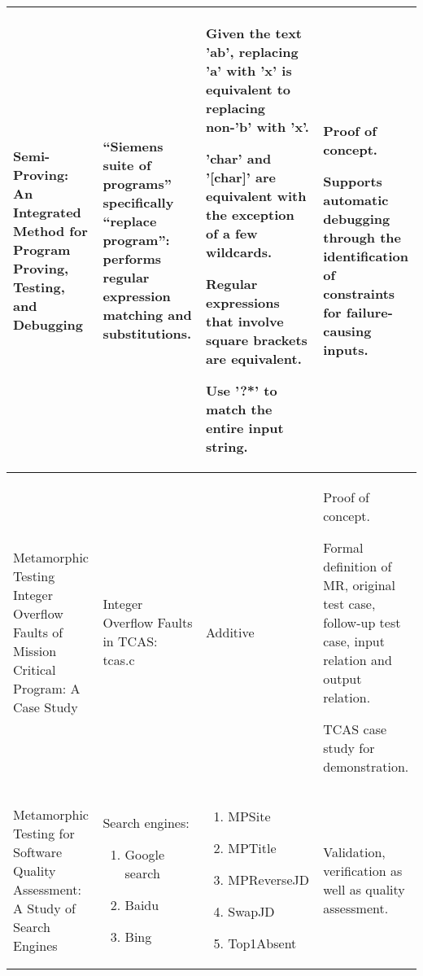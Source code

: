 \begin{singlespace}
\begin{longtable}[c]{| p{3cm} | p{4cm} | p{3.5cm} | p{4cm} |}
  Semi-Proving: An Integrated Method for Program Proving, Testing, and Debugging             &
  “Siemens suite of programs” specifically “replace program”: performs regular expression matching and substitutions.                                                                           &
  Given the text 'ab', replacing 'a' with 'x' is equivalent to replacing non-'b' with 'x'. \par\medskip
  'char' and '[char]' are equivalent with the exception of a few wildcards. \par\medskip
  Regular expressions that involve square brackets are equivalent. \par\medskip
  Use '?*' to match the entire input string.                                                             &
  Proof of concept. \par\medskip
  Supports automatic debugging through the identification of constraints for failure-causing inputs.
  \\

  \hline

  Metamorphic Testing Integer Overflow Faults of Mission Critical Program: A Case Study             &
  Integer Overflow Faults in TCAS: tcas.c                                                                           &
  Additive                                                            &
  Proof of concept. \par\medskip
  Formal definition of MR, original test case, follow-up test case, input relation and output relation. \par\medskip
  TCAS case study for demonstration.
  \\

  \hline
  Metamorphic Testing for Software Quality Assessment: A Study of Search Engines             &
  Search engines:
  \begin{enumerate}
    \item Google search
    \item Baidu
    \item Bing
  \end{enumerate}                                                                        &
  \begin{enumerate}
    \item MPSite
    \item MPTitle
    \item MPReverseJD
    \item SwapJD
    \item Top1Absent
  \end{enumerate}                                                         &
  Validation, verification as well as quality assessment.
  \\


\end{longtable}
\end{singlespace}
